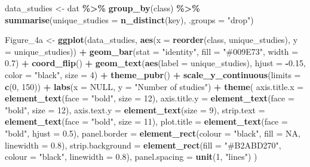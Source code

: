 \documentclass[
]{article}
\newenvironment{Shaded}{\begin{snugshade}}{\end{snugshade}}
\newcommand{\AttributeTok}[1]{\textcolor[rgb]{0.13,0.29,0.53}{#1}}
\newcommand{\ConstantTok}[1]{\textcolor[rgb]{0.56,0.35,0.01}{#1}}
\newcommand{\DecValTok}[1]{\textcolor[rgb]{0.00,0.00,0.81}{#1}}
\newcommand{\FloatTok}[1]{\textcolor[rgb]{0.00,0.00,0.81}{#1}}
\newcommand{\FunctionTok}[1]{\textcolor[rgb]{0.13,0.29,0.53}{\textbf{#1}}}
\newcommand{\NormalTok}[1]{#1}
\newcommand{\OtherTok}[1]{\textcolor[rgb]{0.56,0.35,0.01}{#1}}
\newcommand{\SpecialCharTok}[1]{\textcolor[rgb]{0.81,0.36,0.00}{\textbf{#1}}}
\newcommand{\StringTok}[1]{\textcolor[rgb]{0.31,0.60,0.02}{#1}}
\begin{document}
\begin{Shaded}
\begin{Highlighting}[]
\NormalTok{data\_studies }\OtherTok{\textless{}{-}}\NormalTok{ dat }\SpecialCharTok{\%\textgreater{}\%}
  \FunctionTok{group\_by}\NormalTok{(class) }\SpecialCharTok{\%\textgreater{}\%}
  \FunctionTok{summarise}\NormalTok{(}\AttributeTok{unique\_studies =} \FunctionTok{n\_distinct}\NormalTok{(key), }\AttributeTok{.groups =} \StringTok{"drop"}\NormalTok{)}

\NormalTok{Figure\_4a }\OtherTok{\textless{}{-}} 
  \FunctionTok{ggplot}\NormalTok{(data\_studies, }\FunctionTok{aes}\NormalTok{(}\AttributeTok{x =} \FunctionTok{reorder}\NormalTok{(class, unique\_studies), }\AttributeTok{y =}\NormalTok{ unique\_studies)) }\SpecialCharTok{+}
  \FunctionTok{geom\_bar}\NormalTok{(}\AttributeTok{stat =} \StringTok{"identity"}\NormalTok{, }\AttributeTok{fill =} \StringTok{"\#009E73"}\NormalTok{, }\AttributeTok{width =} \FloatTok{0.7}\NormalTok{) }\SpecialCharTok{+}
  \FunctionTok{coord\_flip}\NormalTok{() }\SpecialCharTok{+}
  \FunctionTok{geom\_text}\NormalTok{(}\FunctionTok{aes}\NormalTok{(}\AttributeTok{label =}\NormalTok{ unique\_studies), }\AttributeTok{hjust =} \SpecialCharTok{{-}}\FloatTok{0.15}\NormalTok{, }\AttributeTok{color =} \StringTok{"black"}\NormalTok{, }\AttributeTok{size =} \DecValTok{4}\NormalTok{) }\SpecialCharTok{+}
  \FunctionTok{theme\_pubr}\NormalTok{() }\SpecialCharTok{+}
  \FunctionTok{scale\_y\_continuous}\NormalTok{(}\AttributeTok{limits =} \FunctionTok{c}\NormalTok{(}\DecValTok{0}\NormalTok{, }\DecValTok{150}\NormalTok{)) }\SpecialCharTok{+}
  \FunctionTok{labs}\NormalTok{(}\AttributeTok{x =} \ConstantTok{NULL}\NormalTok{, }\AttributeTok{y =} \StringTok{"Number of studies"}\NormalTok{) }\SpecialCharTok{+}
  \FunctionTok{theme}\NormalTok{(}
    \AttributeTok{axis.title.x =} \FunctionTok{element\_text}\NormalTok{(}\AttributeTok{face =} \StringTok{"bold"}\NormalTok{, }\AttributeTok{size =} \DecValTok{12}\NormalTok{),}
    \AttributeTok{axis.title.y =} \FunctionTok{element\_text}\NormalTok{(}\AttributeTok{face =} \StringTok{"bold"}\NormalTok{, }\AttributeTok{size =} \DecValTok{12}\NormalTok{),}
    \AttributeTok{axis.text.y =} \FunctionTok{element\_text}\NormalTok{(}\AttributeTok{size =} \DecValTok{9}\NormalTok{),}
    \AttributeTok{strip.text =} \FunctionTok{element\_text}\NormalTok{(}\AttributeTok{face =} \StringTok{"bold"}\NormalTok{, }\AttributeTok{size =} \DecValTok{11}\NormalTok{),}
    \AttributeTok{plot.title =} \FunctionTok{element\_text}\NormalTok{(}\AttributeTok{face =} \StringTok{"bold"}\NormalTok{, }\AttributeTok{hjust =} \FloatTok{0.5}\NormalTok{),}
    \AttributeTok{panel.border =} \FunctionTok{element\_rect}\NormalTok{(}\AttributeTok{colour =} \StringTok{"black"}\NormalTok{, }\AttributeTok{fill =} \ConstantTok{NA}\NormalTok{, }\AttributeTok{linewidth =} \FloatTok{0.8}\NormalTok{),}
    \AttributeTok{strip.background =} \FunctionTok{element\_rect}\NormalTok{(}\AttributeTok{fill =} \StringTok{"\#B2ABD270"}\NormalTok{, }\AttributeTok{colour =} \StringTok{"black"}\NormalTok{, }\AttributeTok{linewidth =} \FloatTok{0.8}\NormalTok{),}
    \AttributeTok{panel.spacing =} \FunctionTok{unit}\NormalTok{(}\DecValTok{1}\NormalTok{, }\StringTok{"lines"}\NormalTok{)}
\NormalTok{  )}


\end{Highlighting}
\end{Shaded}
\end{document}
